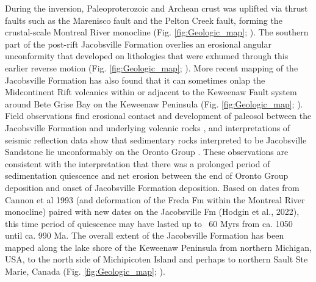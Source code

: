 \documentclass[draft]{agujournal2019}
\begin{document}
During the inversion, Paleoproterozoic and Archean crust was uplifted via thrust faults such as the Marenisco fault and the Pelton Creek fault, forming the crustal-scale Montreal River monocline (Fig. \ref{fig:Geologic_map}; ). The southern part of the post-rift Jacobsville Formation overlies an erosional angular unconformity that developed on lithologies that were exhumed through this earlier reverse motion (Fig. \ref{fig:Geologic_map}; ). More recent mapping of the Jacobsville Formation has also found that it can sometimes onlap the Midcontinent Rift volcanics within or adjacent to the Keweenaw Fault system around Bete Grise Bay on the Keweenaw Peninsula (Fig. \ref{fig:Geologic_map}; ). Field observations find erosional contact and development of paleosol between the Jacobsville Formation and underlying volcanic rocks \cite{Hamblin1958a, Kalliokoski1975a}, and interpretations of seismic reflection data show that sedimentary rocks interpreted to be Jacobsville Sandstone lie unconformably on the Oronto Group \cite{Cannon1989a}. These observations are consistent with the interpretation that there was a prolonged period of sedimentation quiescence and net erosion between the end of Oronto Group deposition and onset of Jacobsville Formation deposition. Based on dates from Cannon et al 1993 (and deformation of the Freda Fm within the Montreal River monocline) paired with new dates on the Jacobsville Fm (Hodgin et al., 2022), this time period of quiescence may have lasted up to ~60 Myrs from ca. 1050 until ca. 990 Ma. The overall extent of the Jacobsville Formation has been mapped along the lake shore of the Keweenaw Peninsula from northern Michigan, USA, to the north side of Michipicoten Island and perhaps to northern Sault Ste Marie, Canada (Fig. \ref{fig:Geologic_map}; ). 
\end{document}

